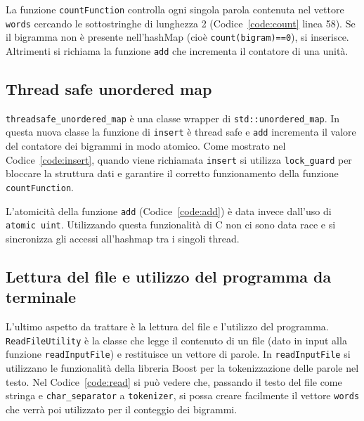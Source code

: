 \documentclass[10pt,twocolumn,letterpaper]{article}
\newcommand{\Rplus}{\protect\hspace{-.1em}\protect\raisebox{.35ex}{\smaller{\smaller\textbf{+}}}}
\newcommand{\CC}{\mbox{C\Rplus\Rplus}\xspace}
\newcommand{\code}[1]{\texttt{#1}}
\begin{document}


La funzione \code{countFunction} controlla ogni singola parola contenuta nel vettore \code{words} cercando le sottostringhe di lunghezza 2 (Codice~\ref{code:count} linea 58).
Se il bigramma non è presente nell'hashMap (cioè \code{count(bigram)==0}), si inserisce.
Altrimenti si richiama la funzione \code{add} che incrementa il contatore di una unità.


\subsection{Thread safe unordered map}
\code{threadsafe\_unordered\_map} è una classe wrapper di \code{std::unordered\_map}. In questa nuova classe la funzione di \code{insert} è thread safe e
\code{add} incrementa il valore del contatore dei bigrammi in modo atomico.
Come mostrato nel Codice~\ref{code:insert}, quando viene richiamata \code{insert} si utilizza \code{lock\_guard} per bloccare la struttura dati e garantire
il corretto funzionamento della funzione \code{countFunction}.


L'atomicità della funzione \code{add} (Codice~\ref{code:add}) è data invece dall'uso di \code{atomic uint}. Utilizzando questa funzionalità di \CC non ci sono data race e si sincronizza
gli accessi all'hashmap tra i singoli thread.


\subsection{Lettura del file e utilizzo del programma da terminale}
L'ultimo aspetto da trattare è la lettura del file e l'utilizzo del programma.
\code{ReadFileUtility} è la classe che legge il contenuto di un file (dato in input alla funzione \code{readInputFile}) e restituisce un vettore di parole.
In \code{readInputFile} si utilizzano le funzionalità della libreria Boost per la tokenizzazione delle parole nel testo.
Nel Codice~\ref{code:read} si può vedere che, passando il testo del file come stringa e \code{char\_separator} a \code{tokenizer}, si possa creare facilmente
il vettore \code{words} che verrà poi utilizzato per il conteggio dei bigrammi.

\end{document}

